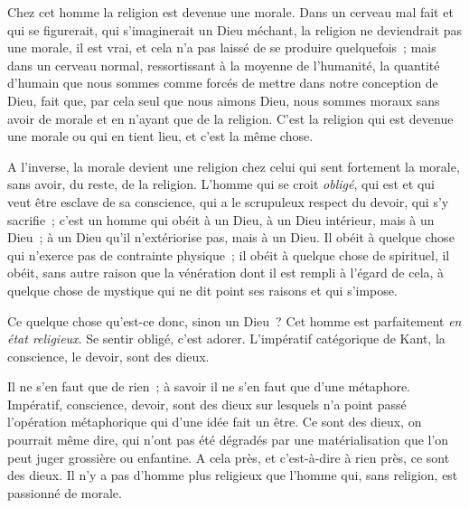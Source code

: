 \documentclass[french,twoside]{book} %
\begin{document}
 Chez cet homme la religion est devenue une morale. Dans un cerveau mal fait et qui se figurerait, qui s’imaginerait un Dieu méchant, la religion ne deviendrait pas une morale, il est vrai, et cela n’a pas laissé de se produire quelquefois ; mais dans un cerveau normal, ressortissant à la moyenne de l’humanité, la quantité d’humain que nous sommes comme forcés de mettre dans notre conception de Dieu, fait que, par cela seul que nous aimons Dieu, nous sommes moraux sans avoir de morale et en n’ayant que de la religion. C’est la religion qui est devenue une morale ou qui en tient lieu, et c’est la même chose.\par
A l’inverse, la morale devient une religion chez celui qui sent fortement la morale, sans avoir, du reste, de la religion. L’homme qui se croit {\itshape obligé}, qui est et qui veut être esclave de sa conscience, qui a le scrupuleux respect du devoir, qui s’y sacrifie ; c’est un homme qui obéit à un Dieu, à un Dieu intérieur, mais à un Dieu ; à un Dieu qu’il n’extériorise pas, mais à un Dieu. Il obéit à quelque chose qui n’exerce pas de contrainte physique ; il obéit à quelque chose de spirituel, il obéit, sans autre raison que la vénération dont il est rempli à l’égard de cela, à quelque chose de mystique qui ne dit point ses raisons et qui s’impose.\par
Ce quelque chose qu’est-ce donc, sinon un Dieu ?  Cet homme est parfaitement {\itshape en état religieux}. Se sentir obligé, c’est adorer. L’impératif catégorique de Kant, la conscience, le devoir, sont des dieux.\par
Il ne s’en faut que de rien ; à savoir il ne s’en faut que d’une métaphore. Impératif, conscience, devoir, sont des dieux sur lesquels n’a point passé l’opération métaphorique qui d’une idée fait un être. Ce sont des dieux, on pourrait même dire, qui n’ont pas été dégradés par une matérialisation que l’on peut juger grossière ou enfantine. A cela près, et c’est-à-dire à rien près, ce sont des dieux. Il n’y a pas d’homme plus religieux que l’homme qui, sans religion, est passionné de morale.\par
\end{document}
